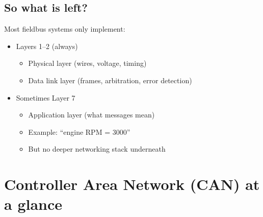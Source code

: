 \subsection{So what is left?}

Most fieldbus systems only implement:

\begin{itemize}
\item Layers 1--2 (always)
\begin{itemize}
\item Physical layer (wires, voltage, timing)
\item Data link layer (frames, arbitration, error detection)
\end{itemize}

\item Sometimes Layer 7
\begin{itemize}
\item Application layer (what messages mean)
\item Example: ``engine RPM = 3000''
\item But no deeper networking stack underneath
\end{itemize}
\end{itemize}

\section{Controller Area Network (CAN) at a glance}

